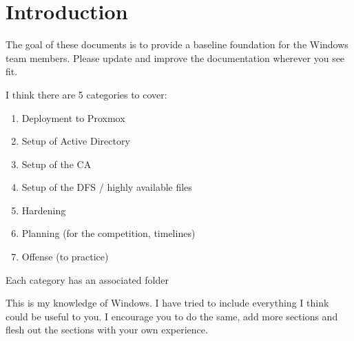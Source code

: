 \documentclass{article}
\begin{document}
\graphicspath{ {./Images/} }
\tableofcontents

\section{Introduction}
The goal of these documents is to provide a baseline foundation for the Windows team members.
Please update and improve the documentation wherever you see fit.

I think there are 5 categories to cover:

\begin{enumerate}
        \item Deployment to Proxmox
        \item Setup of Active Directory
        \item Setup of the CA
        \item Setup of the DFS / highly available files
        \item Hardening
        \item Planning (for the competition, timelines)
        \item Offense (to practice)
\end{enumerate}

Each category has an associated folder

This is my knowledge of Windows. I have tried to include everything I think could be useful to you.
I encourage you to do the same, add more sections and flesh out the sections with your own experience.
\end{document}
